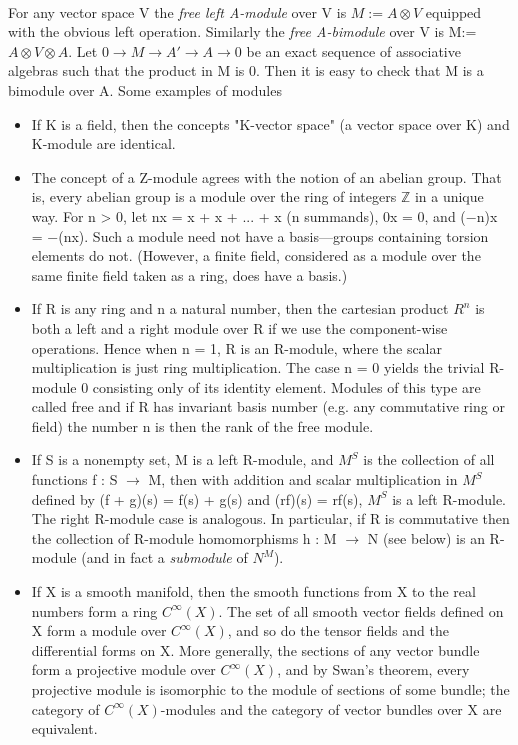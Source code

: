 \documentclass[preprint, 5p, 10pt]{elsarticle}
\theoremstyle{plain}
\begin{document}
\paragraph{}For any vector space V the \textit{free left A-module} over V is 
$M:= A \otimes V$ equipped with the obvious left operation. Similarly the \textit{free A-bimodule} over V 
is M:=$A \otimes V \otimes A.$
Let
 $0 \rightarrow M \rightarrow A' \rightarrow A \rightarrow 0$
be an exact sequence of associative algebras such that the product in M is 0. Then it 
is easy to check that M is a bimodule over A.
Some examples of modules
\begin{itemize}
 \item If K is a field, then the concepts "K-vector space" (a vector space over K) and K-module are identical.
\item The concept of a Z-module agrees with the notion of an abelian group. 
That is, every abelian group is a module over the ring of integers $\mathbb{Z}$ in a unique way. 
For n > 0, let nx = x + x + ... + x (n summands), 0x = 0, and (−n)x = −(nx). Such a module need not have a basis—groups containing torsion elements do not. (However, a finite field, considered as a module over the same finite field taken as a ring, does have a basis.)
\item If R is any ring and n a natural number, then the cartesian product $R^{n}$ 
is both a left and a right module over R if we use the component-wise operations. 
Hence when n = 1, R is an R-module, where the scalar multiplication is just ring 
multiplication. The case n = 0 yields the trivial R-module ${0}$ 
consisting only of its identity element. 
Modules of this type are called free and if R has invariant basis number 
(e.g. any commutative ring or field) the number n is then the rank of the free module.
\item If S is a nonempty set, M is a left R-module, and $M^{S}$ is the collection of all functions f : S $\rightarrow$
 M, then with addition and scalar multiplication in $M^{S}$ defined by (f + g)(s) = f(s) + g(s) and 
(rf)(s) = rf(s), $M^{S}$ is a left R-module. 
The right R-module case is analogous. 
In particular, if R is commutative then the collection of R-module homomorphisms 
h : M $\rightarrow$ N (see below) is an R-module (and in fact a \textit{submodule} of $N^{M}$).
\item If X is a smooth manifold, then the smooth functions from X to the real numbers form a ring 
$C^{\infty}(X)$. 
The set of all smooth vector fields defined on X form a module over $C^{\infty}(X)$, and so 
do the tensor fields and the differential forms on X. 
More generally, the sections of any vector bundle form a projective module over $C^{\infty}(X)$, 
and by Swan's theorem, every projective module is isomorphic to the module of sections of some
 bundle; the category of 
$C^{\infty}(X)$-modules and the category of vector bundles over X are equivalent.
\end{itemize}
\end{document}

